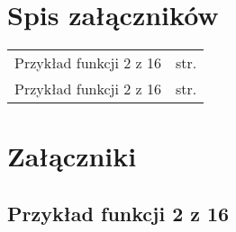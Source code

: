 \chapter*{Spis załączników}
\noindent

\begin{tabularx}{\textwidth}{Xl}
Przykład funkcji 2 z 16 & str. \pageref{file:2outof16.pla} \\
Przykład funkcji 2 z 16 & str. \pageref{file:2outof16.pla} \\
\end{tabularx}

\chapter*{Załączniki}

\section*{Przykład funkcji 2 z 16}
\label{file:2outof16.pla}

\clearpage
